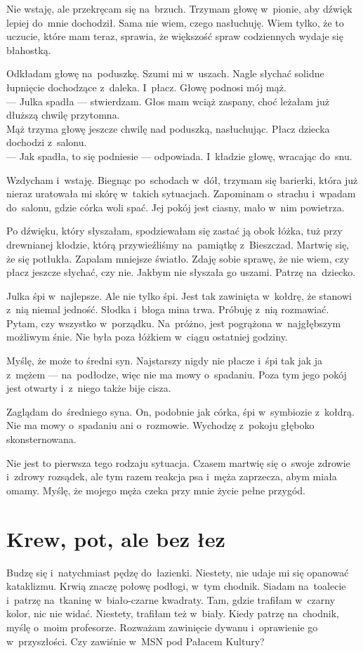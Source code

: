 \documentclass[9pt, a5paper]{memoir}
\begin{document}
Nie wstaję, ale przekręcam się na~brzuch. Trzymam głowę w~pionie, aby dźwięk lepiej do~mnie dochodził. Sama nie wiem, czego nasłuchuję. Wiem tylko, że to uczucie, które mam teraz, sprawia, że większość spraw codziennych wydaje się błahostką.

Odkładam głowę na~poduszkę. Szumi mi w~uszach. Nagle słychać solidne łupnięcie dochodzące z~daleka. I~płacz. Głowę podnosi mój mąż.\\
--- Julka spadła --- stwierdzam. Głos mam wciąż zaspany, choć leżałam już dłuższą chwilę przytomna.\\
Mąż trzyma głowę jeszcze chwilę nad poduszką, nasłuchując. Płacz dziecka dochodzi z~salonu.\\
--- Jak spadła, to się podniesie --- odpowiada. I~kładzie głowę, wracając do~snu.

Wzdycham i~wstaję. Biegnąc po~schodach w~dół, trzymam się barierki, która już nieraz uratowała mi skórę w~takich sytuacjach. Zapominam o~strachu i~wpadam do~salonu, gdzie córka woli spać. Jej pokój jest ciasny, mało w~nim powietrza.

Po dźwięku, który słyszałam, spodziewałam się zastać ją obok łóżka, tuż przy drewnianej kłodzie, którą przywieźliśmy na~pamiątkę z~Bieszczad. Martwię się, że się potłukła. Zapalam mniejsze światło. Zdaję sobie sprawę, że nie wiem, czy płacz jeszcze słychać, czy nie. Jakbym nie słyszała go uszami. Patrzę na~dziecko.

Julka śpi w~najlepsze. Ale nie tylko śpi. Jest tak zawinięta w~kołdrę, że stanowi z~nią niemal jedność. Słodka i~błoga mina trwa. Próbuję z~nią rozmawiać. Pytam, czy wszystko w~porządku. Na~próżno, jest pogrążona w~najgłębszym możliwym śnie. Nie była poza łóżkiem w~ciągu ostatniej godziny.

Myślę, że może to średni syn. Najstarszy nigdy nie płacze i~śpi tak jak ja z~mężem --- na~podłodze, więc nie ma mowy o~spadaniu. Poza tym jego pokój jest otwarty i~z~niego także bije cisza.

Zaglądam do~średniego syna. On, podobnie jak córka, śpi w~symbiozie z~kołdrą. Nie ma mowy o~spadaniu ani o~rozmowie. Wychodzę z~pokoju głęboko skonsternowana.

Nie jest to pierwsza tego rodzaju sytuacja. Czasem martwię się o~swoje zdrowie i~zdrowy rozsądek, ale tym razem reakcja psa i~męża zaprzecza, abym miała omamy. Myślę, że mojego męża czeka przy mnie życie pełne przygód.

\newpage
\section{Krew, pot, ale bez łez}
Budzę się i~natychmiast pędzę do~łazienki. Niestety, nie udaje mi się opanować kataklizmu. Krwią znaczę połowę podłogi, w~tym chodnik. Siadam na~toalecie i~patrzę na~tkaninę w~biało-czarne kwadraty. Tam, gdzie trafiłam w~czarny kolor, nic nie widać. Niestety, trafiłam też w~biały. Kiedy patrzę na~chodnik, myślę o~moim profesorze. Rozważam zawinięcie dywanu i~oprawienie go w~przyszłości. Czy zawiśnie w~MSN pod Pałacem Kultury?
\end{document}

